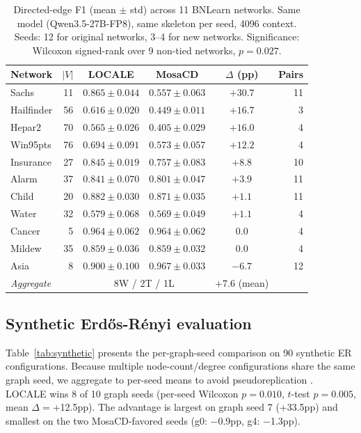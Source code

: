 \documentclass{article}
\begin{document}
\begin{table}[t]
\centering
\caption{Directed-edge F1 (mean $\pm$ std) across 11 BNLearn networks. Same model (Qwen3.5-27B-FP8), same skeleton per seed, 4096 context. Seeds: 12 for original networks, 3--4 for new networks. Significance: Wilcoxon signed-rank over 9 non-tied networks, $p{=}0.027$.}
\label{tab:main}
\small
\begin{tabular}{lrcccr}
\toprule
Network & $|V|$ & LOCALE & MosaCD & $\Delta$ (pp) & Pairs \\
\midrule
Sachs     & 11 & $\mathbf{0.865 \pm 0.044}$ & $0.557 \pm 0.063$ & $+30.7$ & 11 \\
Hailfinder & 56 & $\mathbf{0.616 \pm 0.020}$ & $0.449 \pm 0.011$ & $+16.7$ & 3 \\
Hepar2    & 70 & $\mathbf{0.565 \pm 0.026}$ & $0.405 \pm 0.029$ & $+16.0$ & 4 \\
Win95pts  & 76 & $\mathbf{0.694 \pm 0.091}$ & $0.573 \pm 0.057$ & $+12.2$ & 4 \\
Insurance & 27 & $\mathbf{0.845 \pm 0.019}$ & $0.757 \pm 0.083$ & $+8.8$  & 10 \\
Alarm     & 37 & $0.841 \pm 0.070$ & $0.801 \pm 0.047$ & $+3.9$  & 11 \\
Child     & 20 & $0.882 \pm 0.030$ & $0.871 \pm 0.035$ & $+1.1$  & 11 \\
Water     & 32 & $0.579 \pm 0.068$ & $0.569 \pm 0.049$ & $+1.1$  & 4 \\
Cancer    & 5  & $0.964 \pm 0.062$ & $0.964 \pm 0.062$ & $0.0$   & 4 \\
Mildew    & 35 & $0.859 \pm 0.036$ & $0.859 \pm 0.032$ & $0.0$   & 4 \\
Asia      & 8  & $0.900 \pm 0.100$ & $\mathbf{0.967 \pm 0.033}$ & $-6.7$  & 12 \\
\midrule
\multicolumn{2}{l}{\textit{Aggregate}} & \multicolumn{2}{c}{8W / 2T / 1L} & $+7.6$ (mean) & \\
\bottomrule
\end{tabular}
\end{table}

\subsection{Synthetic Erd\H{o}s-R\'{e}nyi evaluation}
\label{sec:synthetic}

Table~\ref{tab:synthetic} presents the per-graph-seed comparison on 90 synthetic ER configurations. Because multiple node-count/degree configurations share the same graph seed, we aggregate to per-seed means to avoid pseudoreplication \citep{hurlbert1984pseudoreplication}. LOCALE wins 8 of 10 graph seeds (per-seed Wilcoxon $p{=}0.010$, $t$-test $p{=}0.005$, mean $\Delta{=}$+12.5pp). The advantage is largest on graph seed 7 (+33.5pp) and smallest on the two MosaCD-favored seeds (g0: $-$0.9pp, g4: $-$1.3pp).
\end{document}
